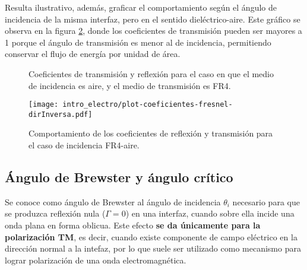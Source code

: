 Resulta ilustrativo, además, graficar el comportamiento según el ángulo de incidencia de la misma interfaz, pero en el sentido dieléctrico-aire. Este gráfico se observa en la figura \ref{fig:coeficientes-fr4-aire}, donde los coeficientes de transmisión pueden ser mayores a 1 porque el ángulo de transmisión es menor al de incidencia, permitiendo conservar el flujo de energía por unidad de área.

\begin{figure}[H]
	\centering 
	\caption{Coeficientes de transmisión y reflexión para el caso en que el medio de incidencia es aire, y el medio de transmisión es FR4.}
	\label{fig:coeficientes-aire-fr4}
\end{figure}


\begin{figure}[htp]
	\centering
	\texttt{[image: intro\_electro/plot-coeficientes-fresnel-dirInversa.pdf]}
	\caption{Comportamiento de los coeficientes de reflexión y transmisión para el caso de incidencia FR4-aire.}
	\label{fig:coeficientes-fr4-aire}
\end{figure}



\subsection{Ángulo de Brewster y ángulo crítico}

Se conoce como ángulo de Brewster al ángulo de incidencia $\theta_i$ necesario para que se produzca reflexión nula ($\Gamma = 0$) en una interfaz, cuando sobre ella incide una onda plana en forma oblicua. Este efecto \textbf{se da únicamente para la polarización TM}, es decir, cuando existe componente de campo eléctrico en la dirección normal a la intefaz, por lo que suele ser utilizado como mecanismo para lograr polarización de una onda electromagnética.

